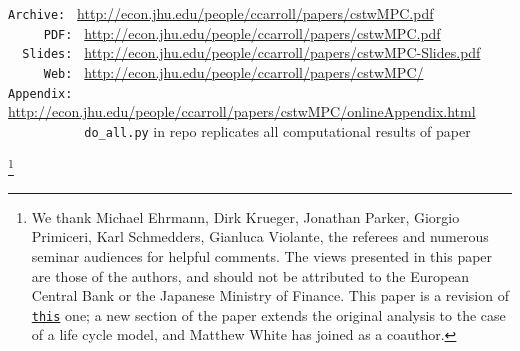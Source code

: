 \documentclass[12pt,titlepage]{econtex}
\begin{document}
\begin{small}
\parbox{\textwidth}{
  \begin{center}
\begin{tabbing}
\texttt{Archive:~} \= \= \url{http://econ.jhu.edu/people/ccarroll/papers/cstwMPC.pdf} \kill \\  %
\texttt{~~~~~PDF:~} \> \> \url{http://econ.jhu.edu/people/ccarroll/papers/cstwMPC.pdf} \\
\texttt{~~Slides:~} \> \> \url{http://econ.jhu.edu/people/ccarroll/papers/cstwMPC-Slides.pdf} \\
\texttt{~~~~~Web:~} \> \> \url{http://econ.jhu.edu/people/ccarroll/papers/cstwMPC/} \\
\texttt{Appendix:~} \> \> \url{http://econ.jhu.edu/people/ccarroll/papers/cstwMPC/onlineAppendix.html} \\
\texttt{~~~~~~~~~~} \> \>  \texttt{do\_all.py} in repo replicates all computational results of paper
\end{tabbing}
\end{center}
}
\end{small}

\begin{authorsinfo}
\end{authorsinfo}



\thanks{We thank Michael Ehrmann, Dirk Krueger, Jonathan Parker, Giorgio Primiceri, Karl Schmedders, Gianluca Violante, the referees and numerous seminar audiences for helpful comments. The views presented in this paper are those of the authors, and should not be attributed to the European Central Bank or the Japanese Ministry of Finance.  This paper is a revision of \href{https://www.ecb.europa.eu/pub/pdf/scpwps/ecbwp1655.pdf}{\texttt{this}} one; a new section of the paper extends the original analysis to the case of a life cycle model, and Matthew White has joined as a coauthor.}
\end{document}
